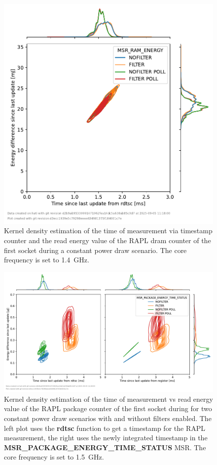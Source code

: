 \begin{figure}[]
    \centering
    \includegraphics[width=0.54\columnwidth]{fig/rapl-update-intervals/MSR_RAM_ENERGY_1400000.pdf}
    \caption{Kernel density estimation of the time of measurement via timestamp counter and the read energy value of the RAPL dram counter of the first socket during a constant power draw scenario.
    The core frequency is set to \SI{1.4}{\GHz}.}
\end{figure}

\clearpage
\begin{figure}[]
    \centering
    \includegraphics[width=\columnwidth]{fig/rapl-update-intervals/MSR_PACKAGE_ENERGY_TIME_STATUS_1500000.pdf}
    \caption{Kernel density estimation of the time of measurement vs read energy value of the RAPL package counter of the first socket during for two constant power draw scenarios with and without filters enabled.
    The left plot uses the \textbf{rdtsc} function to get a timestamp for the RAPL measurement, the right uses the newly integrated timestamp in the \textbf{MSR\_PACKAGE\_ENERGY\_TIME\_STATUS} MSR.
    The core frequency is set to \SI{1.5}{\GHz}.}
\end{figure}

